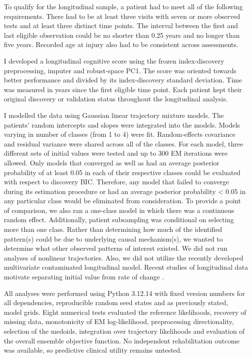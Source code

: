 To qualify for the longitudinal sample, a patient had to meet all of the following requirements. There had to be at least three visits with seven or more observed tests and at least three distinct time points. The interval between the first and last eligible observation could be no shorter than 0.25 years and no longer than five years. Recorded age at injury also had to be consistent across assessments.

I developed a longitudinal cognitive score using the frozen index-discovery preprocessing, imputer and robust-space PC1. The score was oriented towards better performance and divided by its index-discovery standard deviation. Time was measured in years since the first eligible time point. Each patient kept their original discovery or validation status throughout the longitudinal analysis.

I modelled the data using Gaussian linear trajectory mixture models. The patients' random intercepts and slopes were integrated into the models. Models varying in number of classes (from 1 to 4) were fit. Random-effects covariance and residual variance were shared across all of the classes. For each model, three different sets of initial values were tested and up to 300 EM iterations were allowed. Only models that converged as well as had an average posterior probability of at least 0.05 in each of their respective classes could be evaluated with respect to discovery BIC. Therefore, any model that failed to converge during its estimation procedure or had an average posterior probability < 0.05 in any particular class would be eliminated from consideration. To provide a point of comparison, we also ran a one-class model in which there was a continuous random effect. Additionally, patient subsampling was conditional on selecting more than one class. Rather than determining how much of the identified pattern(s) could be due to underlying causal mechanism(s), we wanted to determine what other observed patterns of interest existed. We did not run analyses of nonlinear trajectories. Also, we did not utilize the recently developed multivariate contaminated longitudinal model. Recent studies of longitudinal data motivate separating initial value from rate of change \parencite{julia2026longitudinal}.

All analyses were performed using Python 3.12.14 with fixed version numbers for all dependencies, reproducible random seed states and as previously stated, model grids. Eight numerical tests evaluated the reference likelihoods, recovery of missing data, monotonicity of EM log-likelihood, preprocessing directionality, selection of the medoids, integration over trajectory likelihoods and evaluation of the overall ensemble objective function. No independent rehabilitation outcome was available, so predictive clinical utility remains untested.

